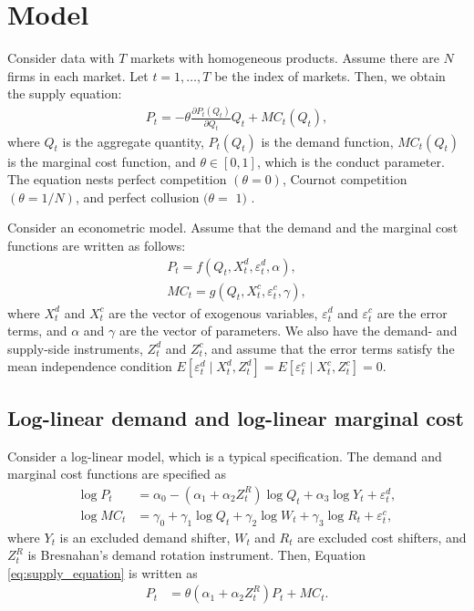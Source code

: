 \documentclass[11pt, a4paper]{article}
\begin{document}
\section{Model}
Consider data with $T$ markets with homogeneous products.
Assume there are $N$ firms in each market.
Let $t = 1,\ldots, T$ be the index of markets.
Then, we obtain the supply equation:
\begin{align}
     P_t = -\theta\frac{\partial P_t(Q_{t})}{\partial Q_{t}}Q_{t} + MC_t(Q_{t}),\label{eq:supply_equation}
\end{align}
where $Q_{t}$ is the aggregate quantity, $P_t(Q_{t})$ is the demand function, $MC_{t}(Q_{t})$ is the marginal cost function, and $\theta\in[0,1]$, which is the conduct parameter. 
The equation nests perfect competition $(\theta=0)$, Cournot competition $(\theta=1 / N)$, and perfect collusion $(\theta=$ $1)$ \citep{bresnahan1982oligopoly}.

Consider an econometric model.
Assume that the demand and the marginal cost functions are written as follows: 
\begin{align*}
    P_t = f(Q_{t}, X^{d}_{t}, \varepsilon^{d}_{t}, \alpha), %
    \\
    MC_t = g(Q_{t}, X^{c}_{t}, \varepsilon^{c}_{t}, \gamma),%
\end{align*}
where $X^{d}_{t}$ and $X^{c}_{t}$ are the vector of exogenous variables, $\varepsilon^{d}_{t}$ and $\varepsilon^{c}_{t}$ are the error terms, and $\alpha$ and $\gamma$ are the vector of parameters.
We also have the demand- and supply-side instruments, $Z^{d}_{t}$ and $Z^{c}_{t}$, and assume that the error terms satisfy the mean independence condition $E[\varepsilon^{d}_{t}\mid X^{d}_{t}, Z^{d}_{t}] = E[\varepsilon^{c}_{t} \mid X^{c}_{t}, Z^{c}_{t}] =0$. 

\subsection{Log-linear demand and log-linear marginal cost}
Consider a log-linear model, which is a typical specification.
The demand and marginal cost functions are specified as
\begin{align}
    \log P_{t} &= \alpha_0 - (\alpha_1 + \alpha_2 Z^{R}_{t}) \log Q_t + \alpha_3 \log Y_t + \varepsilon^{d}_{t},\label{eq:log_linear_demand}\\
    \log MC_t &= \gamma_0 + \gamma_1 \log Q_t +  \gamma_2 \log W_{t} + \gamma_3 \log R_t + \varepsilon^{c}_{t},\label{eq:log_linear_marginal_cost}
\end{align}
where $Y_{t}$ is an excluded demand shifter, $W_t$ and $R_t$ are excluded cost shifters, and $Z_t^R$ is Bresnahan's demand rotation instrument.
Then, Equation \eqref{eq:supply_equation} is written as
\begin{align}
    P_t &= \theta (\alpha_1 + \alpha_2 Z^{R}_{t}) P_t + MC_t.\label{eq:log_linear_supply_equation_direct}
\end{align}
\end{document}
